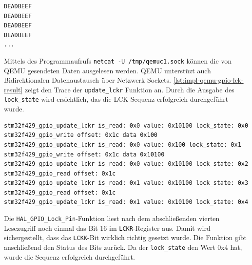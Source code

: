 \begin{minipage}{\linewidth}
\begin{lstlisting}[language=sh,numbers=none,
                label={lst:impl-qemu-uart-socket},
                caption=Ausgabe des Unix Sockets mittels netcat]
DEADBEEF
DEADBEEF
DEADBEEF
DEADBEEF
...
\end{lstlisting}
\end{minipage}

Mittels des Programmaufrufs \texttt{netcat -U /tmp/qemuc1.sock} können die von
QEMU gesendeten Daten ausgelesen werden.
QEMU unterstüzt auch Bidirektionalen Datenaustausch über Netzwerk Sockets.
\newline
\ref{lst:impl-qemu-gpio-lck-result} zeigt den Trace der \texttt{update\_lckr}
Funktion an.
Durch die Ausgabe des \texttt{lock\_state} wird ersichtlich, das die
LCK-Sequenz erfolgreich durchgeführt wurde.

\begin{minipage}{\linewidth}
\begin{lstlisting}[language=sh,numbers=none,
                label={lst:impl-qemu-gpio-lck-result},
                caption=QEMU Ausgabe der GPIO Peripherie während der LCK-Sequenz]
stm32f429_gpio_update_lckr is_read: 0x0 value: 0x10100 lock_state: 0x0
stm32f429_gpio_write offset: 0x1c data 0x100
stm32f429_gpio_update_lckr is_read: 0x0 value: 0x100 lock_state: 0x1
stm32f429_gpio_write offset: 0x1c data 0x10100
stm32f429_gpio_update_lckr is_read: 0x0 value: 0x10100 lock_state: 0x2
stm32f429_gpio_read offset: 0x1c
stm32f429_gpio_update_lckr is_read: 0x1 value: 0x10100 lock_state: 0x3
stm32f429_gpio_read offset: 0x1c
stm32f429_gpio_update_lckr is_read: 0x1 value: 0x10100 lock_state: 0x4
\end{lstlisting}
\end{minipage}

Die \texttt{HAL\_GPIO\_Lock\_Pin}-Funktion liest nach dem abschließenden
vierten Lesezugriff noch einmal das Bit 16 im \texttt{LCKR}-Register aus.
Damit wird sichergestellt, dass das \texttt{LCKK}-Bit wirklich richtig gesetzt
wurde.
Die Funktion gibt anschließend den Status des Bits zurück.
Da der \texttt{lock\_state} den Wert 0x4 hat, wurde die Sequenz erfolgreich
durchgeführt.

